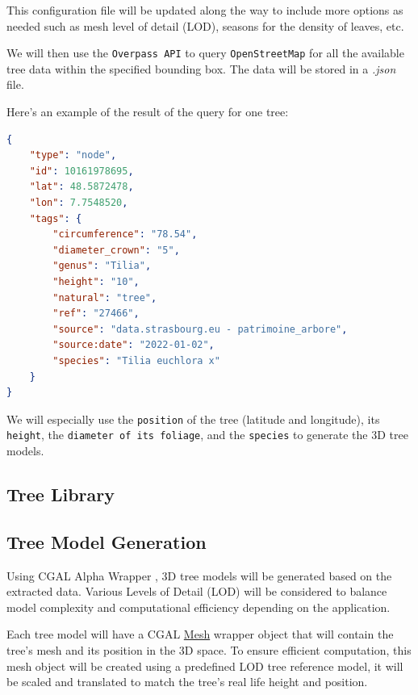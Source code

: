 \documentclass[12pt]{article}
\begin{document}
This configuration file will be updated along the way to include more options
as needed such as mesh level of detail (LOD), seasons for the density of leaves,
etc.

We will then use the \texttt{Overpass API} to query \texttt{OpenStreetMap}
for all the available tree data within the specified bounding box.
The data will be stored in a \textit{.json} file.

\newpage
Here's an example of the result of the query for one tree:

\begin{lstlisting}[language=json]
{
    "type": "node",
    "id": 10161978695,
    "lat": 48.5872478,
    "lon": 7.7548520,
    "tags": {
        "circumference": "78.54",
        "diameter_crown": "5",
        "genus": "Tilia",
        "height": "10",
        "natural": "tree",
        "ref": "27466",
        "source": "data.strasbourg.eu - patrimoine_arbore",
        "source:date": "2022-01-02",
        "species": "Tilia euchlora x"
    }
}
\end{lstlisting}

We will especially use the \texttt{position} of the tree (latitude and longitude),
its \texttt{height}, the \texttt{diameter of its foliage}, and the \texttt{species}
to generate the 3D tree models.

\subsection{Tree Library}

\subsection{Tree Model Generation}
Using CGAL Alpha Wrapper \cite{cgal_alpha_wrapper}, 3D tree models will be generated based on the extracted data. Various 
Levels of Detail (LOD) will be considered to balance model complexity and computational 
efficiency depending on the application.

Each tree model will have a CGAL \href{https://doc.cgal.org/latest/Surface_mesh/classCGAL_1_1Surface__mesh.html}{Mesh} 
wrapper object that will contain the tree's
mesh and its position in the 3D space. To ensure efficient computation, this 
mesh object will be created using a predefined LOD tree reference model, it will
be scaled and translated to match the tree's real life height and position.
\end{document}
